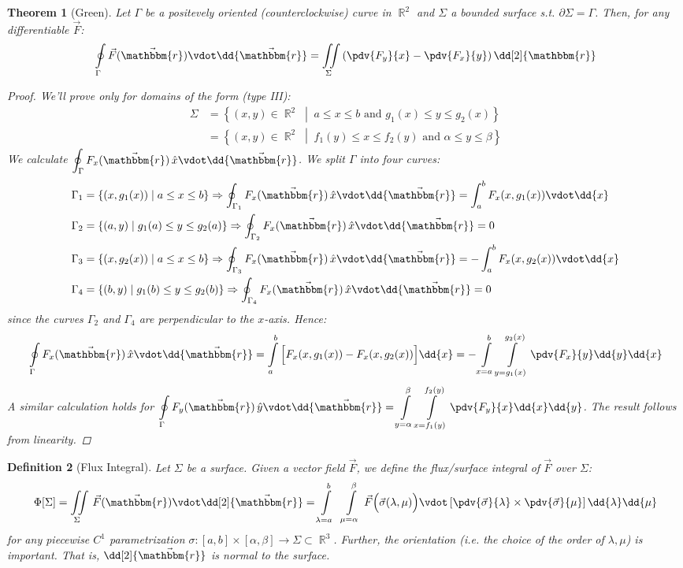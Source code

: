 \documentclass[12pt]{article}
\let\RA\Rightarrow
\newcommand{\set}[2]{\left\{{#1}\;\middle|\;{#2}\right\}}
\DeclareMathOperator{\R}{\mathbb{R}}
\newcommand*{\vF}{\vec{F}}
\newcommand*{\ir}{\mathbbm{r}}
\newcommand*{\irv}{\vec{\mathbbm{r}}}
\newtheorem{theorem}{Theorem}[subsection]
\newtheorem{definition}[theorem]{Definition}
\begin{document}
\begin{theorem}[Green]
  Let $\Gamma$ be a positevely oriented (counterclockwise) curve in $\R^2$ and $\Sigma$ a bounded surface s.t. $\partial\Sigma=\Gamma$. Then, for any differentiable $\vF$: $$\oint\limits_\Gamma\vF(\irv)\vdot\dd{\irv}=\iint\limits_\Sigma\left(\pdv{F_y}{x}-\pdv{F_x}{y}\right)\dd[2]{\ir}$$
  \begin{proof}
    We'll prove only for domains of the form (type III): 
    \begin{align*}
      \Sigma&=\set{(x,y)\in\R^2}{a\leq x\leq b\text{ and }g_1(x)\leq y\leq g_2(x)}\\
      &=\set{(x,y)\in\R^2}{f_1(y)\leq x\leq f_2(y)\text{ and }\alpha\leq y\leq \beta}
    \end{align*}
    We calculate $\displaystyle\oint_\Gamma F_x(\irv)\,\hat{x}\vdot\dd{\irv}$. We split $\Gamma$ into four curves: 
    \begin{align*}
      \Gamma_1&=\set{(x,g_1(x))}{a\leq x\leq b}\RA \displaystyle\oint_{\Gamma_1} F_x(\irv)\,\hat{x}\vdot\dd{\irv}=\int_a^b F_x(x,g_1(x))\vdot\dd{x}\\
      \Gamma_2&=\set{(a,y)}{g_1(a)\leq y\leq g_2(a)}\RA \displaystyle\oint_{\Gamma_2} F_x(\irv)\,\hat{x}\vdot\dd{\irv}=0\\
      \Gamma_3&=\set{(x,g_2(x))}{a\leq x\leq b}\RA \displaystyle\oint_{\Gamma_3} F_x(\irv)\,\hat{x}\vdot\dd{\irv}=-\int_a^b F_x(x,g_2(x))\vdot\dd{x}\\
      \Gamma_4&=\set{(b,y)}{g_1(b)\leq y\leq g_2(b)}\RA \displaystyle\oint_{\Gamma_4} F_x(\irv)\,\hat{x}\vdot\dd{\irv}=0
    \end{align*}
    since the curves $\Gamma_2$ and $\Gamma_4$ are perpendicular to the $x$-axis. Hence: $$\displaystyle\oint\limits_\Gamma F_x(\irv)\,\hat{x}\vdot\dd{\irv}=\int\limits_a^b \Big[F_x(x,g_1(x))-F_x(x,g_2(x))\Big]\dd{x}=-\int\limits_{x=a}^b\int\limits_{y=g_1(x)}^{g_2(x)}\pdv{F_x}{y}\dd{y}\dd{x}$$ A similar calculation holds for $\displaystyle\oint\limits_\Gamma F_y(\irv)\,\hat{y}\vdot\dd{\irv}=\int\limits_{y=\alpha}^\beta\int\limits_{x=f_1(y)}^{f_2(y)}\pdv{F_y}{x}\dd{x}\dd{y}$. The result follows from linearity.
  \end{proof}
\end{theorem}

\begin{definition}[Flux Integral]
  Let $\Sigma$ be a surface. Given a vector field $\vF$, we define the flux/surface integral of $\vF$ over $\Sigma$: $$\Phi[\Sigma]=\iint\limits_\Sigma\,\vF(\irv)\vdot\dd[2]{\irv}=\int\limits_{\lambda=a}^b\;\;\int\limits_{\mu=\alpha}^\beta\,\vF\Big(\vec{\sigma}(\lambda,\mu)\Big)\vdot\left[\pdv{\vec{\sigma}}{\lambda}\times\pdv{\vec{\sigma}}{\mu}\right]\dd{\lambda}\dd{\mu}$$ for any piecewise $C^1$ parametrization $\sigma:[a,b]\times[\alpha,\beta]\to\Sigma\subset\R^3$. Further, the orientation (i.e. the choice of the order of $\lambda,\mu$) is important. That is, $\dd[2]{\irv}$ is normal to the surface.
\end{definition}
\end{document}
